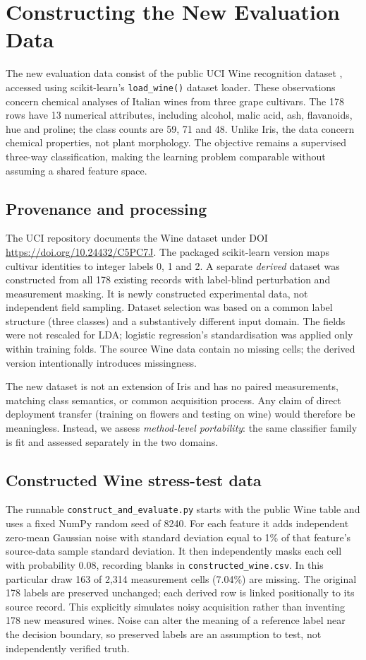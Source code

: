\documentclass[11pt]{article}
\begin{document}
\section{Constructing the New Evaluation Data}
The new evaluation data consist of the public UCI Wine recognition dataset \citep{aeberhard1992}, accessed using scikit-learn's \texttt{load\_wine()} dataset loader. These observations concern chemical analyses of Italian wines from three grape cultivars. The 178 rows have 13 numerical attributes, including alcohol, malic acid, ash, flavanoids, hue and proline; the class counts are 59, 71 and 48. Unlike Iris, the data concern chemical properties, not plant morphology. The objective remains a supervised three-way classification, making the learning problem comparable without assuming a shared feature space.

\subsection{Provenance and processing}
The UCI repository documents the Wine dataset under DOI \url{https://doi.org/10.24432/C5PC7J}. The packaged scikit-learn version maps cultivar identities to integer labels 0, 1 and 2. A separate \emph{derived} dataset was constructed from all 178 existing records with label-blind perturbation and measurement masking. It is newly constructed experimental data, not independent field sampling. Dataset selection was based on a common label structure (three classes) and a substantively different input domain. The fields were not rescaled for LDA; logistic regression's standardisation was applied only within training folds. The source Wine data contain no missing cells; the derived version intentionally introduces missingness.

The new dataset is not an extension of Iris and has no paired measurements, matching class semantics, or common acquisition process. Any claim of direct deployment transfer (training on flowers and testing on wine) would therefore be meaningless. Instead, we assess \emph{method-level portability}: the same classifier family is fit and assessed separately in the two domains.

\subsection{Constructed Wine stress-test data}
The runnable \texttt{construct\_and\_evaluate.py} starts with the public Wine table and uses a fixed NumPy random seed of 8240. For each feature it adds independent zero-mean Gaussian noise with standard deviation equal to 1\% of that feature's source-data sample standard deviation. It then independently masks each cell with probability 0.08, recording blanks in \texttt{constructed\_wine.csv}. In this particular draw 163 of 2,314 measurement cells (7.04\%) are missing. The original 178 labels are preserved unchanged; each derived row is linked positionally to its source record. This explicitly simulates noisy acquisition rather than inventing 178 new measured wines. Noise can alter the meaning of a reference label near the decision boundary, so preserved labels are an assumption to test, not independently verified truth.
\end{document}
